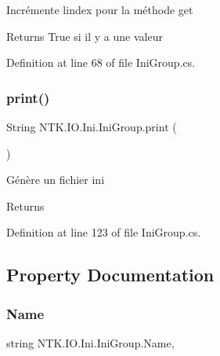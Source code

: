 Incrémente l\textquotesingle{}index pour la méthode get 

\begin{DoxyReturn}{Returns}
True si il y a une valeur
\end{DoxyReturn}


Definition at line 68 of file Ini\+Group.\+cs.

\mbox{\label{class_n_t_k_1_1_i_o_1_1_ini_1_1_ini_group_a7525aa7eb5880cd7fcaa047f1ff83ee6}} 
\subsubsection{\texorpdfstring{print()}{print()}}
{\footnotesize\ttfamily String N\+T\+K.\+I\+O.\+Ini.\+Ini\+Group.\+print (\begin{DoxyParamCaption}{ }\end{DoxyParamCaption})}



Génère un fichier ini 

\begin{DoxyReturn}{Returns}

\end{DoxyReturn}


Definition at line 123 of file Ini\+Group.\+cs.



\subsection{Property Documentation}
\mbox{\label{class_n_t_k_1_1_i_o_1_1_ini_1_1_ini_group_a920a16272bc8eed48620b7c1e6454300}} 
\subsubsection{\texorpdfstring{Name}{Name}}
{\footnotesize\ttfamily string N\+T\+K.\+I\+O.\+Ini.\+Ini\+Group.\+Name\hspace{0.3cm}{\ttfamily [get]}, {\ttfamily [set]}}







